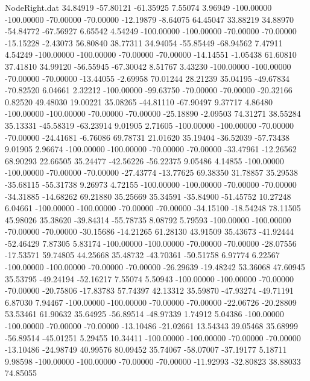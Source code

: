 \begin{filecontents}{NodeRight.dat}
  34.84919  -57.80121  -61.35925     7.55074    3.96949 -100.00000 -100.00000  -70.00000  -70.00000  -12.19879   -8.64075   64.45047   33.88219
  34.88970  -54.84772  -67.56927     6.65542    4.54249 -100.00000 -100.00000  -70.00000  -70.00000  -15.15228   -2.43073   56.80840   38.77311
  34.94054  -55.85449  -68.94562     7.47911    4.54249 -100.00000 -100.00000  -70.00000  -70.00000  -14.14551   -1.05438   61.60810   37.41810
  34.99120  -56.55945  -67.30042     8.51767    3.43230 -100.00000 -100.00000  -70.00000  -70.00000  -13.44055   -2.69958   70.01244   28.21239
  35.04195  -49.67834  -70.82520     6.04661    2.32212 -100.00000  -99.63750  -70.00000  -70.00000  -20.32166    0.82520   49.48030   19.00221
  35.08265  -44.81110  -67.90497     9.37717    4.86480 -100.00000 -100.00000  -70.00000  -70.00000  -25.18890   -2.09503   74.31271   38.55284
  35.13331  -45.58319  -63.23914     9.01905    2.71605 -100.00000 -100.00000  -70.00000  -70.00000  -24.41681   -6.76086   69.78731   21.01620
  35.19404  -36.52039  -57.73438     9.01905    2.96674 -100.00000 -100.00000  -70.00000  -70.00000  -33.47961  -12.26562   68.90293   22.66505
  35.24477  -42.56226  -56.22375     9.05486    4.14855 -100.00000 -100.00000  -70.00000  -70.00000  -27.43774  -13.77625   69.38350   31.78857
  35.29538  -35.68115  -55.31738     9.26973    4.72155 -100.00000 -100.00000  -70.00000  -70.00000  -34.31885  -14.68262   69.21880   35.25669
  35.34591  -35.84900  -51.45752    10.27248    6.04661 -100.00000 -100.00000  -70.00000  -70.00000  -34.15100  -18.54248   78.11505   45.98026
  35.38620  -39.84314  -55.78735     8.08792    5.79593 -100.00000 -100.00000  -70.00000  -70.00000  -30.15686  -14.21265   61.28130   43.91509
  35.43673  -41.92444  -52.46429     7.87305    5.83174 -100.00000 -100.00000  -70.00000  -70.00000  -28.07556  -17.53571   59.74805   44.25668
  35.48732  -43.70361  -50.51758     6.97774    6.22567 -100.00000 -100.00000  -70.00000  -70.00000  -26.29639  -19.48242   53.36068   47.60945
  35.53795  -49.24194  -52.16217     7.55074    5.50943 -100.00000 -100.00000  -70.00000  -70.00000  -20.75806  -17.83783   57.74397   42.13312
  35.59870  -47.93274  -49.71191     6.87030    7.94467 -100.00000 -100.00000  -70.00000  -70.00000  -22.06726  -20.28809   53.53461   61.90632
  35.64925  -56.89514  -48.97339     1.74912    5.04386 -100.00000 -100.00000  -70.00000  -70.00000  -13.10486  -21.02661   13.54343   39.05468
  35.68999  -56.89514  -45.01251     5.29455   10.34411 -100.00000 -100.00000  -70.00000  -70.00000  -13.10486  -24.98749   40.99576   80.09452
  35.74067  -58.07007  -37.19177     5.18711    9.98598 -100.00000 -100.00000  -70.00000  -70.00000  -11.92993  -32.80823   38.88033   74.85055

\end{filecontents}
